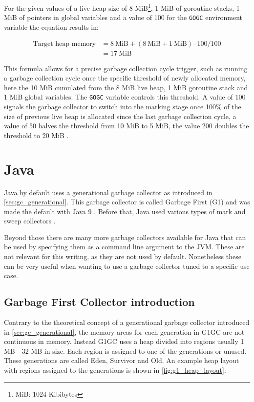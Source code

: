 For the given values of a live heap size of 8 MiB\footnote{MiB: 1024 Kibibytes}, 1 MiB of goroutine stacks,
1 MiB of pointers in global variables and a value of 100 for the \texttt{GOGC}
environment variable the equation results in:

\begin{align}
    \textrm{Target heap memory} &= 8 \ \textrm{MiB} + \left(8 \ \textrm{MiB} + 1 \ \textrm{MiB}\right) \cdot 100 / 100 \\
                                &= 17 \ \textrm{MiB}
\end{align}

This formula allows for a precise garbage collection cycle trigger, such as
running a garbage collection cycle once the specific threshold of newly
allocated memory, here the 10 MiB cumulated from the 8 MiB live heap, 1 MiB
goroutine stack and 1 MiB global variables. The \texttt{GOGC} variable controls
this threshold. A value of 100 signals the garbage collector to switch into the
marking stage once 100\% of the size of previous live heap is allocated since
the last garbage collection cycle, a value of 50 halves the threshold from 10
MiB to 5 MiB, the value 200 doubles the threshold to 20 MiB
\cite[GOGC]{go_gcguide_2022}.

\section{Java}

Java by default uses a generational garbage collector as introduced in
\autoref{sec:gc_generational}. This garbage collector is called Garbage First
(G1) and was made the default with Java 9 \cite{java_gc_comparison_2018}.
Before that, Java used various types of mark and sweep collectors
\cite{java_available_gcs}.

Beyond those there are many more garbage collectors available for Java that can
be used by specifying them as a command line argument to the JVM. These are not
relevant for this writing, as they are not used by default. Nonetheless these
can be very useful when wanting to use a garbage collector tuned to a specific
use case.

\subsection{Garbage First Collector introduction}

Contrary to the theoretical concept of a generational garbage collector introduced in \autoref{sec:gc_generational},
the memory areas for each generation in G1GC are not continuous in memory.
Instead G1GC uses a heap divided into regions usually 1 MB - 32 MB in size.
Each region is assigned to one of the generations or unused.
These generations are called Eden, Survivor and Old. \cite{java_g1_getting_started}
An example heap layout with regions assigned to the generations is shown in \autoref{fig:g1_heap_layout}.

